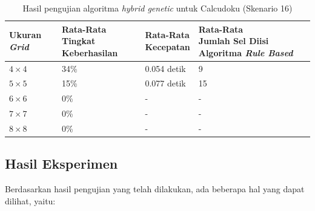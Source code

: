 \begin{table}
\centering
\captionsetup{justification=centering}
\caption[Hasil pengujian algoritma \textit{hybrid genetic} untuk Calcudoku (Skenario 16)]{Hasil pengujian algoritma \textit{hybrid genetic} untuk Calcudoku (Skenario 16)}
\begin{tabular}{| l | l | l | l |}
\hline
Ukuran \textit{Grid} & \makecell[l]{Rata-Rata \\ Tingkat Keberhasilan} & \makecell[l]{Rata-Rata \\ Kecepatan} & \makecell[l]{Rata-Rata \\ Jumlah Sel Diisi Algoritma \textit{Rule Based}} \\
\hline \hline
\begin{math}4 \times 4\end{math} & 34\% & 0.054 detik & 9 \\
\hline
\begin{math}5 \times 5\end{math} & 15\% & 0.077 detik & 15 \\
\hline
\begin{math}6 \times 6\end{math} & 0\% & - & - \\
\hline
\begin{math}7 \times 7\end{math} & 0\% & - & - \\
\hline
\begin{math}8 \times 8\end{math} & 0\% & - & - \\
\hline
\end{tabular}
\label{tab:pengujianhg16}
\end{table}
\clearpage

\subsection{Hasil Eksperimen}
\label{sec:hasileksperimen}

Berdasarkan hasil pengujian yang telah dilakukan, ada beberapa hal yang dapat dilihat, yaitu:

